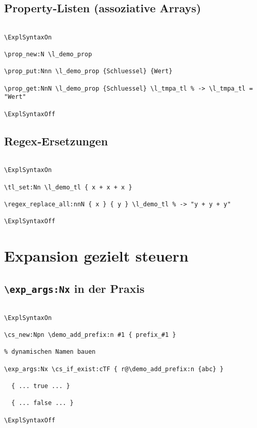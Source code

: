 \documentclass[11pt,a4paper]{book}
\begin{document}
\section{Property‑Listen (assoziative Arrays)}

\begin{verbatim}

\ExplSyntaxOn

\prop_new:N \l_demo_prop

\prop_put:Nnn \l_demo_prop {Schluessel} {Wert}

\prop_get:NnN \l_demo_prop {Schluessel} \l_tmpa_tl % -> \l_tmpa_tl = "Wert"

\ExplSyntaxOff

\end{verbatim}



\section{Regex‑Ersetzungen}

\begin{verbatim}

\ExplSyntaxOn

\tl_set:Nn \l_demo_tl { x + x + x }

\regex_replace_all:nnN { x } { y } \l_demo_tl % -> "y + y + y"

\ExplSyntaxOff

\end{verbatim}



\chapter{Expansion gezielt steuern}

\section{\texorpdfstring{\texttt{\textbackslash exp\_args:Nx}}{\\exp\_args:Nx} in der Praxis}

\begin{verbatim}

\ExplSyntaxOn

\cs_new:Npn \demo_add_prefix:n #1 { prefix_#1 }

% dynamischen Namen bauen

\exp_args:Nx \cs_if_exist:cTF { r@\demo_add_prefix:n {abc} }

  { ... true ... }

  { ... false ... }

\ExplSyntaxOff

\end{verbatim}
\end{document}
